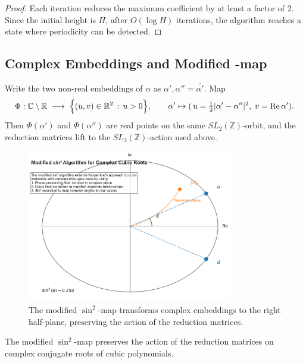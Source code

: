 \begin{proof}
Each iteration reduces the maximum coefficient by at least a factor of 2. Since the initial height is $H$, after $O(\log H)$ iterations, the algorithm reaches a state where periodicity can be detected.
\end{proof}

\subsection{Complex Embeddings and Modified \sinsq-map}

\begin{definition}\label{def:modified_sin2}
Write the two non-real embeddings of $\alpha$ as $\alpha',\alpha''= \overline{\alpha'}$.
Map
\[
\Phi:\mathbb{C}\setminus\mathbb{R} \;\longrightarrow\;
\Bigl\{(u,v)\in\mathbb{R}^{2}\,:\,u>0\Bigr\},\qquad
\alpha' \mapsto (\,u=\tfrac12|\alpha'-\alpha''|^{2},\;v=\operatorname{Re}\alpha').
\]
Then $\Phi(\alpha')$ and $\Phi(\alpha'')$ are real points on the same $SL_{2}(\mathbb{Z})$-orbit, and the reduction matrices lift to the $SL_{3}(\mathbb{Z})$-action used above.
\end{definition}

\begin{figure}[htbp]
\centering
\includegraphics[width=0.8\textwidth]{figures/sin2_algorithm_visualization.pdf}
\caption{The modified $\sin^2$-map transforms complex embeddings to the right half-plane, preserving the action of the reduction matrices.}
\label{fig:complex_embedding}
\end{figure}

\begin{lemma}\label{lem:complex_conjugate}
The modified $\sin^2$-map preserves the action of the reduction matrices on complex conjugate roots of cubic polynomials.
\end{lemma}

